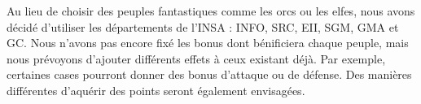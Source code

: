 Au lieu de choisir des peuples fantastiques comme les orcs ou les elfes, nous avons décidé d'utiliser les départements de l'INSA : INFO, SRC, EII, SGM, GMA et GC. Nous n'avons pas encore fixé les bonus dont bénificiera chaque peuple, mais nous prévoyons d'ajouter différents effets à ceux existant déjà. Par exemple, certaines cases pourront donner des bonus d'attaque ou de défense. Des manières différentes d'aquérir des points seront également envisagées.